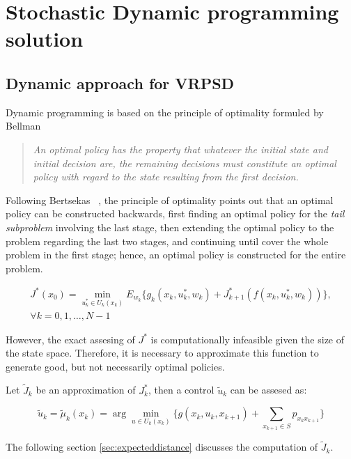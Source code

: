 \chapter{Stochastic Dynamic programming solution}
\label{chap:dp_methodology}


\section{Dynamic approach for VRPSD}

Dynamic programming is based on the principle of optimality formuled by Bellman ~\cite{bellman_theory_1954}

\begin{quote}
 \textit{An optimal policy has the property that whatever the initial state and initial decision are, the remaining decisions must constitute an optimal policy with regard to the state resulting from the first decision.}
\end{quote}

Following Bertsekas ~\cite{bertsekas_dynamic_1995}, the principle of optimality points out that an optimal policy can be constructed backwards, first finding an optimal policy for the \textit{tail subproblem} involving the last stage, then extending the optimal policy to the problem regarding the last two stages, and continuing until cover the whole problem in the first stage; hence, an optimal policy is constructed for the entire problem.

\begin{multline}
 J^*(x_0) = \min\limits_{u_k^*\in U_k(x_k)}E_{w_k}\biggr\{g_k(x_k,u_k^*,w_k)+J^*_{k+1}(f(x_k,u_k^*,w_k))\biggr\},\\
\forall k=0,1,\ldots,N-1
\end{multline}

However, the exact assesing of $J^*$ is computationally infeasible given the size of the state space. Therefore, it is necessary to approximate this function to generate good, but not necessarily optimal policies.

Let $\tilde{J}_k$ be an approximation of $J^*_k$, then a control $\tilde{u}_k$ can be assesed as:

\begin{equation}\label{eq:control_aprox}
\tilde{u}_k=\tilde{\mu}_k(x_k)=\arg \min\limits_{u\in U_k(x_k)} \biggr\{ g(x_k,u_k,x_{k+1}) + \sum_{x_{k+1}\in S}p_{x_kx_{k+1}}\biggr\}
\end{equation}

The following section \ref{sec:expecteddistance} discusses the computation of $\tilde{J}_k$.

